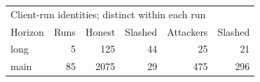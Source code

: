 \begin{tabular}{lrrrrr}
\toprule
\multicolumn{6}{l}{Client-run identities; distinct within each run} \\
Horizon & Runs & Honest & Slashed & Attackers & Slashed \\
\midrule
long & 5 & 125 & 44 & 25 & 21 \\
main & 85 & 2075 & 29 & 475 & 296 \\
\bottomrule
\end{tabular}

